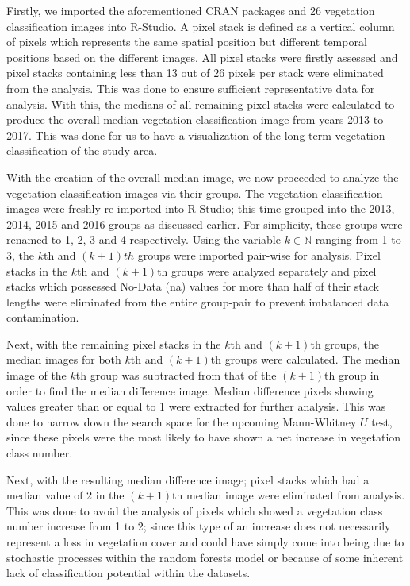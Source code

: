 \justify
Firstly, we imported the aforementioned CRAN packages and 26 vegetation classification images into R-Studio. A pixel stack is defined as a vertical column of pixels which represents the same spatial position but different temporal positions based on the different images. All pixel stacks were firstly assessed and pixel stacks containing less than 13 out of 26 pixels per stack were eliminated from the analysis. This was done to ensure sufficient representative data for analysis. With this, the medians of all remaining pixel stacks were calculated to produce the overall median vegetation classification image from years 2013 to 2017. This was done for us to have a visualization of the long-term vegetation classification of the study area.

\justify
With the creation of the overall median image, we now proceeded to analyze the vegetation classification images via their groups. The vegetation classification images were freshly re-imported into R-Studio; this time grouped into the 2013, 2014, 2015 and 2016 groups as discussed earlier. For simplicity, these groups were renamed to 1, 2, 3 and 4 respectively. Using the variable $k \in \mathbb{N}$ ranging from 1 to 3, the $k$th and $(k+1)th$ groups were imported pair-wise for analysis. Pixel stacks in the $k$th and $(k+1)$th groups were analyzed separately and pixel stacks which possessed No-Data (\ac{na}) values for more than half of their stack lengths were eliminated from the entire group-pair to prevent imbalanced data contamination. 

\justify
Next, with the remaining pixel stacks in the $k$th and $(k+1)$th groups, the median images for both $k$th and $(k+1)$th groups were calculated. The median image of the $k$th group was subtracted from that of the $(k+1)$th group in order to find the median difference image. Median difference pixels showing values greater than or equal to 1 were extracted for further analysis. This was done to narrow down the search space for the upcoming Mann-Whitney $U$ test, since these pixels were the most likely to have shown a net increase in vegetation class number. 

\justify
Next, with the resulting median difference image; pixel stacks which had a median value of 2 in the $(k+1)$th median image were eliminated from analysis. This was done to avoid the analysis of pixels which showed a vegetation class number increase from 1 to 2; since this type of an increase does not necessarily represent a loss in vegetation cover and could have simply come into being due to stochastic processes within the random forests model or because of some inherent lack of classification potential within the datasets.  

